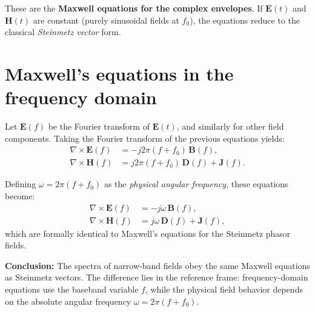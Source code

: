 These are the \textbf{Maxwell equations for the complex envelopes}.  
If $\mathbf{E}(t)$ and $\mathbf{H}(t)$ are constant (purely sinusoidal fields at $f_0$), the equations reduce to the classical \emph{Steinmetz vector} form.

\section{Maxwell’s equations in the frequency domain}

Let $\mathbf{E}(f)$ be the Fourier transform of $\mathbf{E}(t)$, and similarly for other field components.  
Taking the Fourier transform of the previous equations yields:
\begin{align}
    \nabla\times\mathbf{E}(f) &= -j2\pi(f+f_0)\,\mathbf{B}(f),\\
    \nabla\times\mathbf{H}(f) &= j2\pi(f+f_0)\,\mathbf{D}(f) + \mathbf{J}(f).
\end{align}

Defining $\omega = 2\pi(f+f_0)$ as the \emph{physical angular frequency}, these equations become:
\begin{align}
    \nabla\times\mathbf{E}(f) &= -j\omega\,\mathbf{B}(f),\\
    \nabla\times\mathbf{H}(f) &= j\omega\,\mathbf{D}(f) + \mathbf{J}(f),
\end{align}
which are formally identical to Maxwell’s equations for the Steinmetz phasor fields.

\begin{center}
\textbf{Conclusion:}  
The spectra of narrow-band fields obey the same Maxwell equations as Steinmetz vectors.  
The difference lies in the reference frame: frequency-domain equations use the baseband variable $f$,  
while the physical field behavior depends on the absolute angular frequency $\omega = 2\pi(f+f_0)$.
\end{center}


